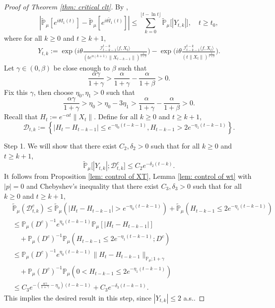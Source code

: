 \documentclass[12pt,a4paper]{amsart}
\theoremstyle{plain}
\theoremstyle{definition}
\numberwithin{equation}{section}
\begin{document}
\begin{proof}[Proof of Theorem \ref{thm: critical clt}]
    By \cite[Lemma 3.4.3]{Durrett2010Probability},
\begin{equation}\label{ineq: control of I1t}
    |\mathbb{\widetilde{P}}_{\mu}[e^{i\theta I_1(t)}] - \mathbb{\widetilde{P}}_{\mu} [e^{i\theta\widetilde{I}_1(t)}]|
    \leq \sum_{k=0}^{\lfloor t-\ln t \rfloor}\mathbb{\widetilde{P}}_{\mu}\big[|Y_{t,k}|\big],
    \quad t\geq t_0,
\end{equation}
    where for all $k \geq 0$ and $t\geq k+1$,
\begin{align}
    Y_{t,k}
    :=\exp\Big(i\theta\frac{\mathcal I_{t-k-1}^{t-k}\langle f ,X_t\rangle}{(t e^{\alpha(k+1)}\|X_{t-k-1}\|)^{\frac{1}{1+\beta}}}\Big)-\exp\Big(i\theta\frac{\mathcal I_{t-k-1}^{t-k}\langle f ,X_t\rangle}{(t\|X_t\|)^{\frac{1}{1+\beta}}}\Big).
\end{align}
    Let $\gamma \in (0,\beta)$ be close enough to $\beta$ such that
\[
    \frac{\alpha \gamma}{1+\gamma} > \frac{\alpha}{1+\gamma} - \frac{\alpha}{1+\beta} > 0.
\]
    Fix this $\gamma$, then choose $\eta_0,\eta_1>0$ such that
\[
    \frac{\alpha \gamma}{1+\gamma} >\eta_0 > \eta_0 - 3\eta_1 > \frac{\alpha}{1+\gamma} - \frac{\alpha}{1+\beta} > 0.
\]
    Recall that $H_t := e^{-\alpha t}\|X_t\|$.
    Define for all $k \geq 0$ and $t\geq k+1$,
\begin{equation}
\label{def: Dtk}
    \mathcal{D}_{t,k}:=\left\{|H_t-H_{t-k-1}|\leq  e^{-\eta_0 (t-k-1)}, H_{t-k-1}> 2e^{-\eta_1(t-k-1)}\right\}.
\end{equation}

    Step 1. We will show that there exist $C_2,\delta_2 >0$ such that for all $k \geq 0$ and $t\geq k+1$,
\begin{equation}
\label{thm121}
    \mathbb{\widetilde{P}}_{\mu}\big[|Y_{t,k}|;\mathcal{D}^c_{t,k}\big]
    \leq C_2 e^{-\delta_2 (t-k)}.
\end{equation}
    It follows from Proposition \ref{lem: control of XT}, Lemma \ref{lem: control of wt} with $|p|=0$ and Chebyshev's inequality that there exist $C_3, \delta_3>0$ such that for all $k \geq 0$ and $t\geq k+1$,
\begin{align}
\label{eq: prob of Dtkc}
    &\mathbb{\widetilde{P}}_{\mu}(\mathcal{D}_{t,k}^c)
    \leq \mathbb{\widetilde{P}}_{\mu}(|H_t-H_{t-k-1}| > e^{-\eta_0 (t-k-1)})+\mathbb{\widetilde{P}}_{\mu}(H_{t-k-1}\leq 2e^{-\eta_1(t-k-1)})
    \\&\leq \mathbb{P}_{\mu}(D^c)^{-1}e^{\eta_0(t-k-1)}\mathbb{P}_{\mu}[|H_t-H_{t-k-1}|]
    \\&\quad 
    +\mathbb{P}_{\mu}(D^c)^{-1} \mathbb P_\mu(H_{t-k-1}\leq 2e^{-\eta_1(t-k-1)}; D^c)
    \\&\leq \mathbb{P}_{\mu}(D^c)^{-1}  e^{\eta_0(t-k-1)}\|H_t - H_{t-k-1}\|_{\mathbb P_\mu; 1+\gamma}
    \\&\quad + \mathbb{P}_{\mu}(D^c)^{-1} \mathbb P_\mu(0<H_{t-k-1}\leq 2e^{-\eta_1(t-k-1)})
    \\&\leq C_3 e^{-(\frac{\alpha \gamma}{1+\gamma} - \eta_0)(t-k-1)}+C_3 e^{-\delta_3(t-k-1)}.
\end{align}
    This implies the desired result in this step, since $|Y_{t,k}| \leq 2$ a.s..


\end{proof}
\end{document}
